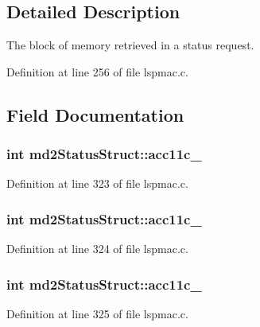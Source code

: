 \subsection{Detailed Description}
The block of memory retrieved in a status request. 

Definition at line 256 of file lspmac.\-c.



\subsection{Field Documentation}
\hypertarget{structmd2StatusStruct_a69fc2e30a5de0a11c992d133e7a761cd}{
\subsubsection[{acc11c\-\_\-1}]{\setlength{\rightskip}{0pt plus 5cm}int md2\-Status\-Struct\-::acc11c\-\_}}\label{structmd2StatusStruct_a69fc2e30a5de0a11c992d133e7a761cd}


Definition at line 323 of file lspmac.\-c.

\hypertarget{structmd2StatusStruct_ad186f06cb4670b00b8af8264d1da66a4}{
\subsubsection[{acc11c\-\_\-2}]{\setlength{\rightskip}{0pt plus 5cm}int md2\-Status\-Struct\-::acc11c\-\_}}\label{structmd2StatusStruct_ad186f06cb4670b00b8af8264d1da66a4}


Definition at line 324 of file lspmac.\-c.

\hypertarget{structmd2StatusStruct_a20a15620e12888f61c0aed1e47e97932}{
\subsubsection[{acc11c\-\_\-3}]{\setlength{\rightskip}{0pt plus 5cm}int md2\-Status\-Struct\-::acc11c\-\_}}\label{structmd2StatusStruct_a20a15620e12888f61c0aed1e47e97932}


Definition at line 325 of file lspmac.\-c.

